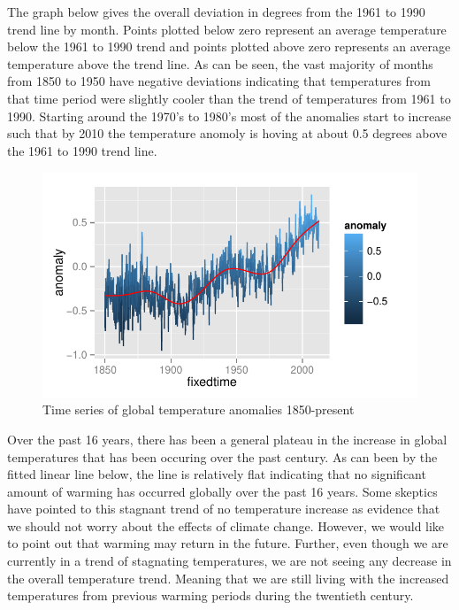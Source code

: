 \documentclass{article}\usepackage{graphicx, color}
\newenvironment{knitrout}{}{} %
\begin{document}
The graph below gives the overall deviation in degrees from the 1961 to 1990 trend line by month. Points plotted below zero represent an average temperature below the 1961 to 1990 trend and points plotted above zero represents an average temperature above the trend line. As can be seen, the vast majority of months from 1850 to 1950 have negative deviations indicating that temperatures from that time period were slightly cooler than the trend of temperatures from 1961 to 1990. Starting around the 1970's to 1980's most of the anomalies start to increase such that by 2010 the temperature anomoly is hoving at about 0.5 degrees above the 1961 to 1990 trend line.
\begin{figure}[H]
\begin{knitrout}
\color{fgcolor}\includegraphics[width=\linewidth]{figure/plot-trend} 
\end{knitrout}

\caption{\label{alltopresent}Time series of global temperature anomalies 1850-present}
\end{figure}
Over the past 16 years, there has been a general plateau in the increase in global temperatures that has been occuring over the past century. As can been by the fitted linear line below, the line is relatively flat indicating that no significant amount of warming has occurred globally over the past 16 years. Some skeptics have pointed to this stagnant trend of no temperature increase as evidence that we should not worry about the effects of climate change. However, we would like to point out that warming may return in the future. Further, even though we are currently in a trend of stagnating temperatures, we are not seeing any decrease in the overall temperature trend. Meaning that we are still living with the increased temperatures from previous warming periods during the twentieth century.
\end{document}

